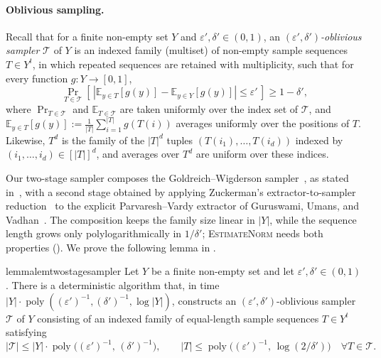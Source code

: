 \documentclass[11pt]{article}
\theoremstyle{definition}
\renewcommand{\label}[1]{}%
\newcommand{\E}{\mathbb{E}}
\newcommand{\poly}{\operatorname{poly}}
\newcommand{\abs}[1]{\left\lvert #1 \right\rvert}
\newcommand{\EstimateNorm}{\textnormal{\textsc{EstimateNorm}}}
\begin{document}
\paragraph{Oblivious sampling.}
Recall that for a finite non-empty set $Y$ and $\varepsilon', \delta' \in (0, 1)$, an \emph{$(\varepsilon', \delta')$-oblivious sampler} $\mathcal{T}$ of $Y$ is an indexed family (multiset) of non-empty sample sequences $T \in Y^t$, in which repeated sequences are retained with multiplicity, such that for every function $g : Y \to [0, 1]$,
\begin{equation}\label{eq:oblivious-sampler}
    \Pr_{T \in \mathcal{T}}\!\left[\,\abs{\E_{y \in T}[g(y)] - \E_{y \in Y}[g(y)]} \le \varepsilon'\,\right] \ge 1 - \delta',
\end{equation}
where $\Pr_{T \in \mathcal{T}}$ and $\E_{T \in \mathcal{T}}$ are taken uniformly over the index set of $\mathcal{T}$, and $\E_{y \in T}[g(y)] := \frac{1}{\abs{T}}\sum_{i=1}^{\abs{T}} g(T(i))$ averages uniformly over the positions of $T$. Likewise, $T^d$ is the family of the $\abs{T}^d$ tuples $(T(i_1), \dots, T(i_d))$ indexed by $(i_1, \dots, i_d) \in [\abs{T}]^d$, and averages over $T^d$ are uniform over these indices.

Our two-stage sampler composes the Goldreich--Wigderson sampler~\cite{GoldreichW97}, as stated in~\cite[Lemma~4.4]{AFKLM24}, with a second stage obtained by applying Zuckerman's extractor-to-sampler reduction~\cite[Lemma~2.6 \& Proposition~2.7]{Zuckerman97} to the explicit Parvaresh--Vardy extractor of Guruswami, Umans, and Vadhan~\cite[Theorem~1.5 \& Theorem~5.12]{GUV09}. The composition keeps the family size linear in $\abs{Y}$, while the sequence length grows only polylogarithmically in $1/\delta'$; \EstimateNorm{} needs both properties (). We prove the following lemma in .

\begin{restatable}{lemma}{lemtwostagesampler}\label{lem:two-stage-sampler}
Let $Y$ be a finite non-empty set and let $\varepsilon', \delta' \in (0, 1)$. There is a deterministic algorithm that, in time $\abs{Y} \cdot \poly((\varepsilon')^{-1}, (\delta')^{-1}, \log\abs{Y})$, constructs an $(\varepsilon', \delta')$-oblivious sampler $\mathcal{T}$ of $Y$ consisting of an indexed family of equal-length sample sequences $T \in Y^t$ satisfying
\begin{equation}\label{eq:two-stage-sampler}
    \abs{\mathcal{T}} \le \abs{Y} \cdot \poly\!\big((\varepsilon')^{-1}, \, (\delta')^{-1}\big), \qquad
    \abs{T} \le \poly\!\big((\varepsilon')^{-1}, \, \log(2/\delta')\big) \quad \forall T \in \mathcal{T}.
\end{equation}
\end{restatable}
\end{document}
